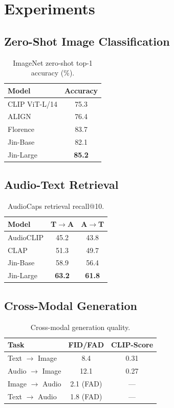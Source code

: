 \section{Experiments}


\subsection{Zero-Shot Image Classification}

\begin{table}[h]
\centering
\caption{ImageNet zero-shot top-1 accuracy (\%).}
\label{tab:imagenet}
\begin{tabular}{lc}
\toprule
\textbf{Model} & \textbf{Accuracy} \\
\midrule
CLIP ViT-L/14 & 75.3 \\
ALIGN & 76.4 \\
Florence & 83.7 \\
\midrule
Jin-Base & 82.1 \\
Jin-Large & \textbf{85.2} \\
\bottomrule
\end{tabular}
\end{table}

\subsection{Audio-Text Retrieval}

\begin{table}[h]
\centering
\caption{AudioCaps retrieval recall@10.}
\label{tab:audiocaps}
\begin{tabular}{lcc}
\toprule
\textbf{Model} & \textbf{T$\rightarrow$A} & \textbf{A$\rightarrow$T} \\
\midrule
AudioCLIP & 45.2 & 43.8 \\
CLAP & 51.3 & 49.7 \\
\midrule
Jin-Base & 58.9 & 56.4 \\
Jin-Large & \textbf{63.2} & \textbf{61.8} \\
\bottomrule
\end{tabular}
\end{table}

\subsection{Cross-Modal Generation}

\begin{table}[h]
\centering
\caption{Cross-modal generation quality.}
\label{tab:generation}
\begin{tabular}{lcc}
\toprule
\textbf{Task} & \textbf{FID/FAD} & \textbf{CLIP-Score} \\
\midrule
Text $\rightarrow$ Image & 8.4 & 0.31 \\
Audio $\rightarrow$ Image & 12.1 & 0.27 \\
Image $\rightarrow$ Audio & 2.1 (FAD) & --- \\
Text $\rightarrow$ Audio & 1.8 (FAD) & --- \\
\bottomrule
\end{tabular}
\end{table}

